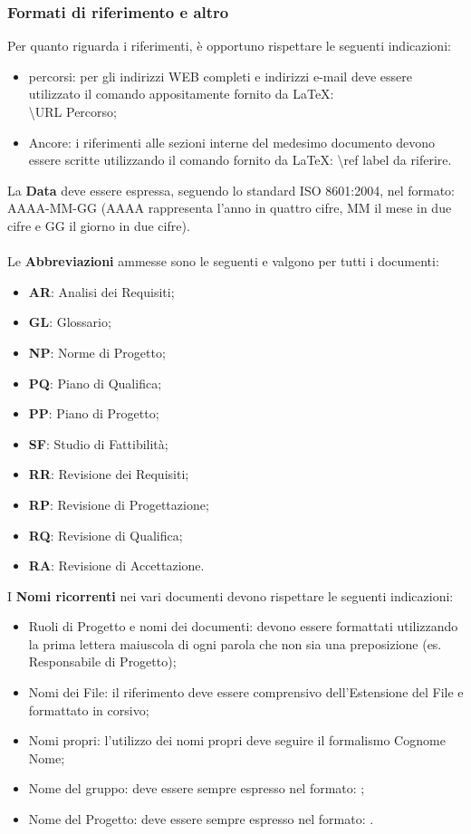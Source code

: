 {{		\subsubsection{Formati di riferimento e altro}{
			\label{sub:rif}
			Per quanto riguarda i riferimenti, è opportuno rispettare le seguenti indicazioni:
			\begin{itemize}
				\item percorsi: per gli indirizzi\ped{g} WEB completi e indirizzi e-mail deve essere utilizzato il comando appositamente fornito da \LaTeX:\\ \textbackslash URL \textbraceleft Percorso\textbraceright;
				\item Ancore: i riferimenti alle sezioni interne del medesimo documento devono essere scritte utilizzando il comando fornito da \LaTeX: \textbackslash ref \textbraceleft label da riferire\textbraceright .
			\end{itemize}
			La \textbf{Data} deve essere espressa, seguendo lo standard ISO 8601:2004, nel formato: AAAA-MM-GG (AAAA rappresenta l'anno in quattro cifre, MM il mese in due cifre e GG il giorno in due cifre).\\
			\\
			Le \textbf{Abbreviazioni} ammesse sono le seguenti e valgono per tutti i documenti:
			\begin{itemize}
				\item \textbf{AR}: Analisi dei Requisiti;
				\item \textbf{GL}: Glossario;
				\item \textbf{NP}: Norme di Progetto;
				\item \textbf{PQ}: Piano di Qualifica;
				\item \textbf{PP}: Piano di Progetto;
				\item \textbf{SF}: Studio di Fattibilità;
				\item \textbf{RR}: Revisione dei Requisiti;
				\item \textbf{RP}: Revisione di Progettazione;
				\item \textbf{RQ}: Revisione di Qualifica;
				\item \textbf{RA}: Revisione di Accettazione.
			\end{itemize}
			I \textbf{Nomi ricorrenti} nei vari documenti devono rispettare le seguenti indicazioni:
			\begin{itemize}
				\item Ruoli di Progetto e nomi dei documenti: devono essere formattati utilizzando la prima lettera maiuscola di ogni parola che non sia una preposizione (es. Responsabile di Progetto);
				\item Nomi dei File: il riferimento deve essere comprensivo dell’Estensione\ped{g} del File e formattato in corsivo;
				\item Nomi propri: l’utilizzo dei nomi propri deve seguire il formalismo Cognome Nome;
				\item Nome del gruppo: deve essere sempre espresso nel formato: \gruppo;
				\item Nome del Progetto: deve essere sempre espresso nel formato: \premi.
			\end{itemize}
			}
}}
